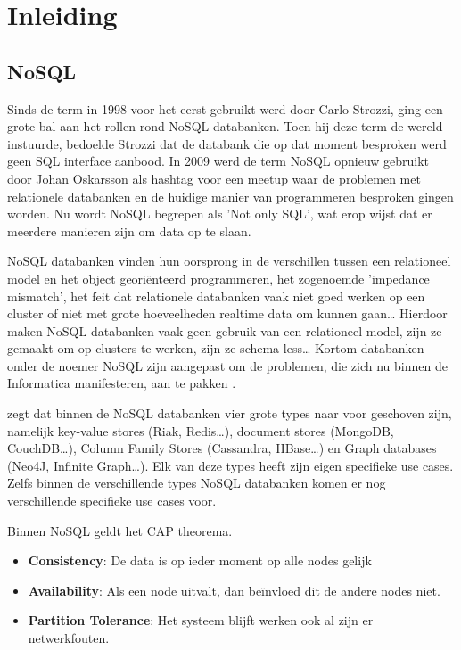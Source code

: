 \chapter{Inleiding}
\label{ch:inleiding}

\section{NoSQL}
Sinds de term in 1998 voor het eerst gebruikt werd door Carlo Strozzi, ging een grote bal aan het rollen rond NoSQL databanken.
Toen hij deze term de wereld instuurde, bedoelde Strozzi dat de databank die op dat moment besproken werd geen SQL interface aanbood.
In 2009 werd de term NoSQL opnieuw gebruikt door Johan Oskarsson als hashtag voor een meetup waar de problemen met relationele databanken en de huidige manier van programmeren besproken gingen worden.
Nu wordt NoSQL begrepen als 'Not only SQL', wat erop wijst dat er meerdere manieren zijn om data op te slaan. \citep{Fowler2013Introduction}

NoSQL databanken vinden hun oorsprong in de verschillen tussen een relationeel model en het object georiënteerd programmeren, het zogenoemde 'impedance mismatch', het feit dat relationele databanken vaak niet goed werken op een cluster of niet met grote hoeveelheden realtime data om kunnen gaan\dots
Hierdoor maken NoSQL databanken vaak geen gebruik van een relationeel model, zijn ze gemaakt om op clusters te werken, zijn ze schema-less\dots
Kortom databanken onder de noemer NoSQL zijn aangepast om de problemen, die zich nu binnen de Informatica manifesteren, aan te pakken \citep{Fowler2012NoSQLDef}.

\cite{Sadalage2014OverviewNoSQL} zegt dat binnen de NoSQL databanken vier grote types naar voor geschoven zijn, namelijk key-value stores (Riak, Redis\dots), document stores (MongoDB, CouchDB\dots), Column Family Stores (Cassandra, HBase\dots) en Graph databases (Neo4J, Infinite Graph\dots).
Elk van deze types heeft zijn eigen specifieke use cases.
Zelfs binnen de verschillende types NoSQL databanken komen er nog verschillende specifieke use cases voor.

Binnen NoSQL geldt het CAP theorema.
\begin{itemize}
	\item \textbf{Consistency}: De data is op ieder moment op alle nodes gelijk
	\item \textbf{Availability}: Als een node uitvalt, dan beïnvloed dit de andere nodes niet.
	\item \textbf{Partition Tolerance}: Het systeem blijft werken ook al zijn er netwerkfouten.
\end{itemize}

